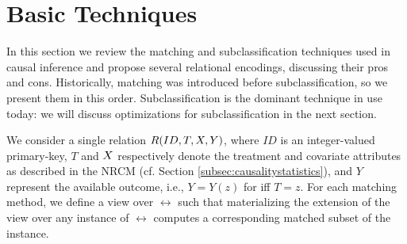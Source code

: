 \vspace{-.35cm}

\section{Basic Techniques}
\label{sec:BasicTechniques}





In this section we review the matching and subclassification
techniques used in causal inference and propose several relational
encodings, discussing their pros and cons.  Historically, matching was
introduced before subclassification, so we present them in this order.
Subclassification is the dominant technique in use today: we will
discuss optimizations for subclassification in the next section.

We consider a single relation ${{R}}(ID,T,{{X}},Y)$,
where $ID$ is an integer-valued primary-key, $T$ and ${{X}}$
respectively denote the treatment and covariate attributes as
described in the NRCM (cf. Section \ref{subsec:causalitystatistics}),
and $Y$ represent the available outcome, i.e., $Y=Y(z)$ for iff $T=z$. For each matching method, we define a view over $\rel$ such that
materializing the extension of the view over any instance of $\rel$
computes a corresponding matched subset of the instance.


\vspace{0.3cm}



